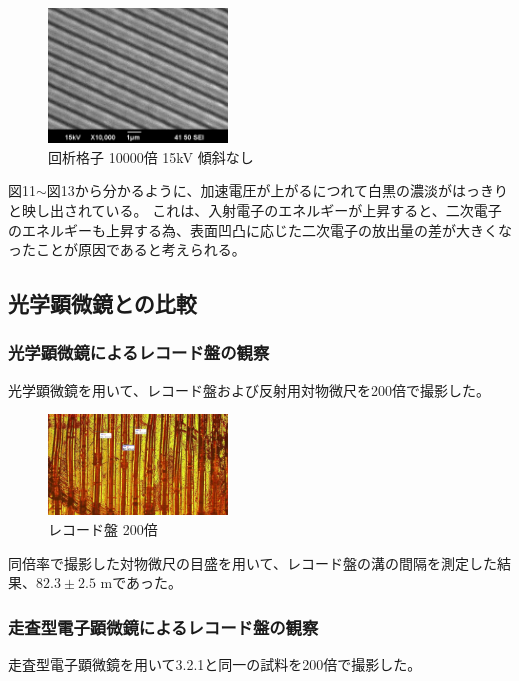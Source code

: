 \documentclass[a4paper,11pt]{jsarticle}
\begin{document}
\begin{figure}[H]
  \centering
  \includegraphics[width=0.425\textwidth]{figs/0523/kaisetukousi/10000_15kv.pdf}
  \caption{回析格子 10000倍 15kV 傾斜なし}
\end{figure}
図11$\sim$図13から分かるように、加速電圧が上がるにつれて白黒の濃淡がはっきりと映し出されている。
これは、入射電子のエネルギーが上昇すると、二次電子のエネルギーも上昇する為、表面凹凸に応じた二次電子の放出量の差が大きくなったことが原因であると考えられる。\\
\subsection{光学顕微鏡との比較}
\subsubsection{光学顕微鏡によるレコード盤の観察}
光学顕微鏡を用いて、レコード盤および反射用対物微尺を200倍で撮影した。
\begin{figure}[H]
  \centering
  \includegraphics[width=0.425\textwidth]{figs/0523/record.pdf}
  \caption{レコード盤 200倍}
\end{figure}
同倍率で撮影した対物微尺の目盛を用いて、レコード盤の溝の間隔を測定した結果、$82.3\pm 2.5$ \textmu mであった。\\
\subsubsection{走査型電子顕微鏡によるレコード盤の観察}
走査型電子顕微鏡を用いて3.2.1と同一の試料を200倍で撮影した。\\
\end{document}
